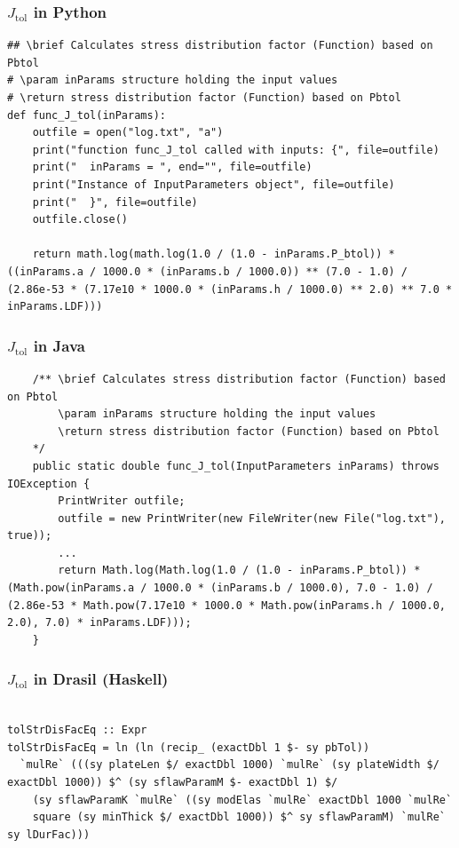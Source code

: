 \documentclass{beamer}
\begin{document}
\begin{frame}

\frametitle{$J_{\mbox{tol}}$ in Python}

\begin{lstlisting}
## \brief Calculates stress distribution factor (Function) based on Pbtol
# \param inParams structure holding the input values
# \return stress distribution factor (Function) based on Pbtol
def func_J_tol(inParams):
    outfile = open("log.txt", "a")
    print("function func_J_tol called with inputs: {", file=outfile)
    print("  inParams = ", end="", file=outfile)
    print("Instance of InputParameters object", file=outfile)
    print("  }", file=outfile)
    outfile.close()
    
    return math.log(math.log(1.0 / (1.0 - inParams.P_btol)) * ((inParams.a / 1000.0 * (inParams.b / 1000.0)) ** (7.0 - 1.0) / (2.86e-53 * (7.17e10 * 1000.0 * (inParams.h / 1000.0) ** 2.0) ** 7.0 * inParams.LDF)))
\end{lstlisting}
\end{frame}


\begin{frame}

\frametitle{$J_{\mbox{tol}}$ in Java}

\begin{lstlisting}
    /** \brief Calculates stress distribution factor (Function) based on Pbtol
        \param inParams structure holding the input values
        \return stress distribution factor (Function) based on Pbtol
    */
    public static double func_J_tol(InputParameters inParams) throws IOException {
        PrintWriter outfile;
        outfile = new PrintWriter(new FileWriter(new File("log.txt"), true));
        ...
        return Math.log(Math.log(1.0 / (1.0 - inParams.P_btol)) * (Math.pow(inParams.a / 1000.0 * (inParams.b / 1000.0), 7.0 - 1.0) / (2.86e-53 * Math.pow(7.17e10 * 1000.0 * Math.pow(inParams.h / 1000.0, 2.0), 7.0) * inParams.LDF)));
    }
\end{lstlisting}
\end{frame}


\begin{frame}

\frametitle{$J_{\mbox{tol}}$ in Drasil (Haskell)}

\begin{lstlisting}

tolStrDisFacEq :: Expr
tolStrDisFacEq = ln (ln (recip_ (exactDbl 1 $- sy pbTol))
  `mulRe` (((sy plateLen $/ exactDbl 1000) `mulRe` (sy plateWidth $/ exactDbl 1000)) $^ (sy sflawParamM $- exactDbl 1) $/
    (sy sflawParamK `mulRe` ((sy modElas `mulRe` exactDbl 1000 `mulRe`
    square (sy minThick $/ exactDbl 1000)) $^ sy sflawParamM) `mulRe` sy lDurFac)))

\end{lstlisting}
\end{frame}
\end{document}
